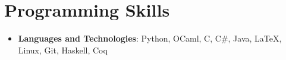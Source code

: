 \documentclass[letterpaper,10.95pt]{article}
\newcommand{\resumeSubHeadingListStart}{\begin{itemize}[leftmargin=*]}
\newcommand{\resumeSubHeadingListEnd}{\end{itemize}}
\begin{document}
\section{Programming Skills}
  \resumeSubHeadingListStart
    \item{
      \textbf{Languages and Technologies}{: Python, OCaml, C, C\#, Java, \LaTeX, Linux, Git, Haskell, Coq}
    }
  \resumeSubHeadingListEnd
\end{document}
